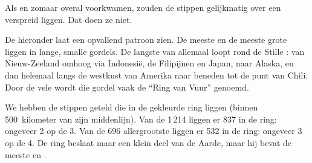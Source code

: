 Als  en  zomaar overal voorkwamen, zouden de stippen
gelijkmatig over een  verspreid liggen. Dat doen ze niet.

De  hieronder laat een opvallend patroon zien. De meeste  en
de meeste grote  liggen in lange, smalle gordels. De langste
van allemaal loopt rond de Stille : van Nieuw-Zeeland omhoog via
Indonesië, de Filipijnen en Japan, naar Alaska, en dan helemaal langs de
westkust van Amerika naar beneden tot de punt van Chili. Door de vele
 wordt die gordel vaak de ``Ring van Vuur'' genoemd.

\begin{example}\label{ex:g4:volcanoes-earthquakes-first-look:shares}
We hebben de stippen geteld die in de gekleurde ring liggen (binnen
500~kilometer van zijn middenlijn). Van de 1\,214  liggen er 837 in
de ring: ongeveer 2 op de 3. Van de 696 allergrootste  liggen
er 532 in de ring: ongeveer 3 op de 4. De ring beslaat maar een klein deel
van de Aarde, maar hij bevat de meeste  en .
\end{example}

